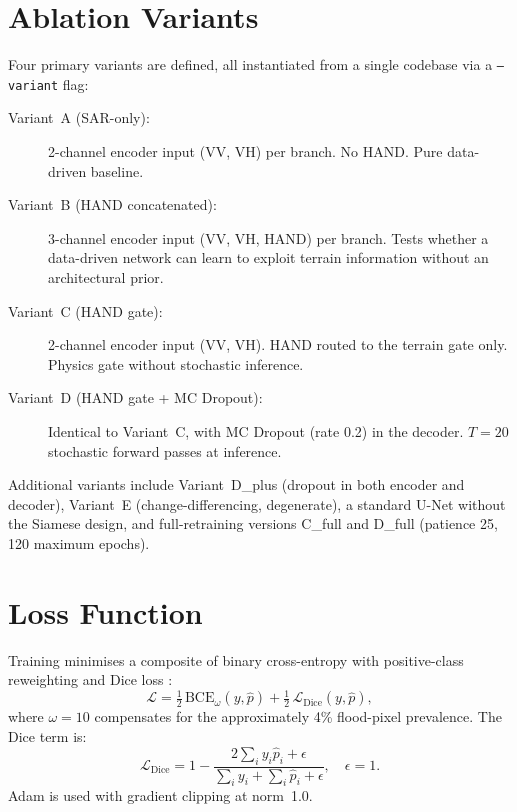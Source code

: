 \documentclass[12pt,oneside]{report}
\begin{document}
\section{Ablation Variants}
\label{sec:variants}

Four primary variants are defined, all instantiated from a single codebase via
a \texttt{--variant} flag:

\begin{description}
  \item[Variant~A (SAR-only):] 2-channel encoder input (VV, VH) per branch.
        No HAND.  Pure data-driven baseline.

  \item[Variant~B (HAND concatenated):] 3-channel encoder input (VV, VH,
        HAND) per branch.  Tests whether a data-driven network can learn to
        exploit terrain information without an architectural prior.

  \item[Variant~C (HAND gate):] 2-channel encoder input (VV, VH).  HAND
        routed to the terrain gate only.  Physics gate without stochastic
        inference.

  \item[Variant~D (HAND gate + MC Dropout):] Identical to Variant~C, with
        MC Dropout (rate 0.2) in the decoder.  $T = 20$ stochastic forward
        passes at inference.
\end{description}

Additional variants include Variant~D\_plus (dropout in both encoder and
decoder), Variant~E (change-differencing, degenerate), a standard U-Net
without the Siamese design, and full-retraining versions C\_full and D\_full
(patience 25, 120 maximum epochs).

\section{Loss Function}

Training minimises a composite of binary cross-entropy with positive-class
reweighting and Dice loss \cite{milletari2016vnet}:
\begin{equation}
  \mathcal{L} = \tfrac{1}{2}\,\mathrm{BCE}_\omega(y,\hat{p})
              + \tfrac{1}{2}\,\mathcal{L}_\text{Dice}(y,\hat{p}),
  \label{eq:loss}
\end{equation}
where $\omega = 10$ compensates for the approximately 4\% flood-pixel
prevalence.  The Dice term is:
\begin{equation}
  \mathcal{L}_\text{Dice} = 1 - \frac{2\sum_i y_i \hat{p}_i + \epsilon}
                                    {\sum_i y_i + \sum_i \hat{p}_i + \epsilon},
  \quad \epsilon = 1.
  \label{eq:dice}
\end{equation}
Adam \cite{kingma2015adam} is used with gradient clipping at norm~1.0.
\end{document}
